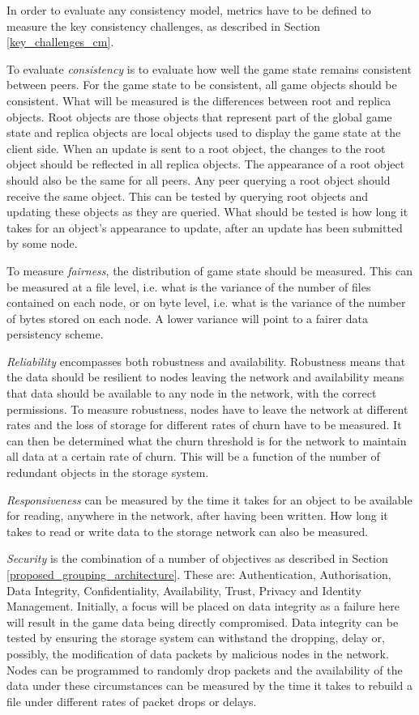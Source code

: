 \documentclass[journal,oneside,a4paper,onecolumn]{IEEEtran}
\begin{document}
In order to evaluate any consistency model, metrics have to be defined to measure the key consistency challenges, as described in Section \ref{key_challenges_cm}.

To evaluate \emph{consistency} is to evaluate how well the game state remains consistent between peers. For the game state to be consistent, all game objects should be consistent. What will be measured is the differences between root and replica objects. Root objects are those objects that represent part of the global game state and replica objects are local objects used to display the game state at the client side. When an update is sent to a root object, the changes to the root object should be reflected in all replica objects. The appearance of a root object should also be the same for all peers. Any peer querying a root object should receive the same object. This can be tested by querying root objects and updating these objects as they are queried. What should be tested is how long it takes for an object's appearance to update, after an update has been submitted by some node.

To measure \emph{fairness}, the distribution of game state should be measured. This can be measured at a file level, i.e. what is the variance of the number of files contained on each node, or on byte level, i.e. what is the variance of the number of bytes stored on each node. A lower variance will point to a fairer data persistency scheme.

\emph{Reliability} encompasses both robustness and availability. Robustness means that the data should be resilient to nodes leaving the network and availability means that data should be available to any node in the network, with the correct permissions. To measure robustness, nodes have to leave the network at different rates and the loss of storage for different rates of churn have to be measured. It can then be determined what the churn threshold is for the network to maintain all data at a certain rate of churn. This will be a function of the number of redundant objects in the storage system.

\emph{Responsiveness} can be measured by the time it takes for an object to be available for reading, anywhere in the network, after having been written. How long it takes to read or write data to the storage network can also be measured.

\emph{Security} is the combination of a number of objectives as described in Section \ref{proposed_grouping_architecture}. These are: Authentication, Authorisation, Data Integrity, Confidentiality, Availability, Trust, Privacy and Identity Management. Initially, a focus will be placed on data integrity as a failure here will result in the game data being directly compromised. Data integrity can be tested by ensuring the storage system can withstand the dropping, delay or, possibly, the modification of data packets by malicious nodes in the network. Nodes can be programmed to randomly drop packets and the availability of the data under these circumstances can be measured by the time it takes to rebuild a file under different rates of packet drops or delays.
\end{document}

